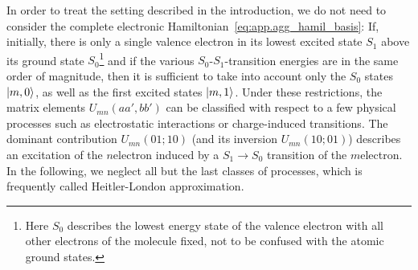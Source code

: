 %

In order to treat the setting described in the introduction, we do not need to consider the complete electronic Hamiltonian~\ref{eq:app.agg_hamil_basis}:
If, initially, there is only a single valence electron in its lowest excited state $S_1$ above its ground state $S_0$\footnote{%
  Here $S_0$ describes the lowest energy state of the valence electron with all other electrons of the molecule fixed, not to be confused with the atomic ground states.
}
and if the various $S_0$-$S_1$-transition energies are in the same order of magnitude, then it is sufficient to take into account only the $S_0$ states $| m, 0 \rangle$, as well as the first excited states $| m, 1 \rangle$.
Under these restrictions, the matrix elements $U_{mn}(aa', bb')$ can be classified with respect to a few physical processes such as electrostatic interactions or charge-induced transitions.
The dominant contribution $U_{mn}(01; 10)$ (and its inversion $U_{mn}(10; 01)$) describes an excitation of the $n$\th electron induced by a $S_1 \to S_0$ transition of the $m$\th electron.
In the following, we neglect all but the last classes of processes, which is frequently called Heitler-London approximation.

